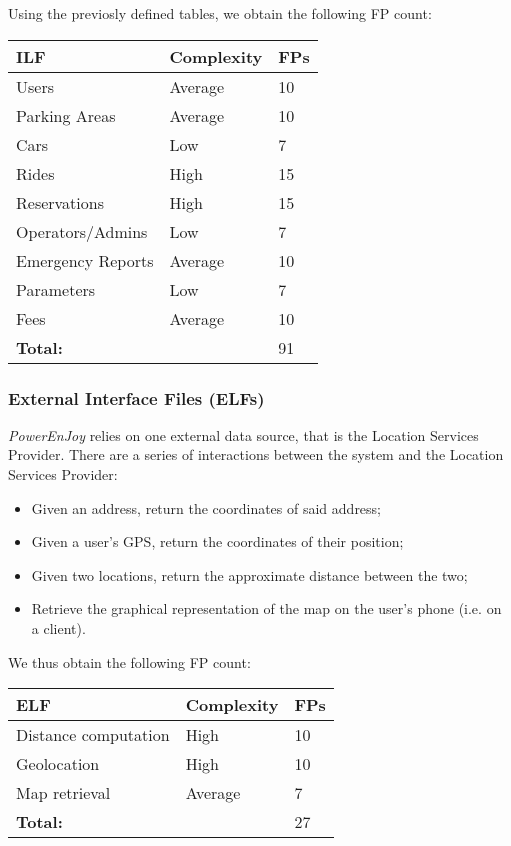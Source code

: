 Using the previosly defined tables, we obtain the following FP count:\\ %

	\begin{tabular}{|l|l|l|}
		\hline
		\textbf{ILF} & \textbf{Complexity} & \textbf{FPs}\\ \hline
		Users & Average & 10\\ \hline
		Parking Areas & Average & 10\\ \hline
		Cars & Low & 7\\ \hline
		Rides & High & 15\\ \hline
		Reservations & High & 15\\ \hline
		Operators/Admins & Low & 7\\ \hline
		Emergency Reports & Average & 10\\ \hline
		Parameters & Low & 7\\ \hline
		Fees & Average & 10\\ \hline
		\multicolumn{2}{|l|}{\textbf{Total:}}& 91 \\ \hline
	\end{tabular}


\subsubsection{External Interface Files (ELFs)}
\textit{PowerEnJoy} relies on one external data source, that is the Location Services Provider. 
There are a series of interactions between the system and the Location Services Provider:

	\begin{itemize}
		\item Given an address, return the coordinates of said address;
		\item Given a user's GPS, return the coordinates of their position;
		\item Given two locations, return the approximate distance between the two;
		\item Retrieve the graphical representation of the map on the user's phone (i.e. on a client).
	\end{itemize}

We thus obtain the following FP count: \\

	\begin{tabular}{|l|l|l|}
		\hline
		\textbf{ELF} & \textbf{Complexity} & \textbf{FPs}\\ \hline
		Distance computation & High & 10 \\ \hline
		Geolocation & High & 10\\ \hline
		Map retrieval & Average & 7\\ \hline
		\multicolumn{2}{|l|}{\textbf{Total:}}& 27 \\ \hline
	\end{tabular}

